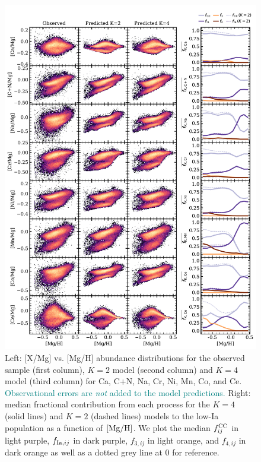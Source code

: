 \documentclass[modern]{aastex631}
\newcommand{\mgh}{[{\rm Mg}/{\rm H}]}
\newcommand{\fcc}{f_{ij}^{\rm CC}}
\newcommand{\add}[1]{\textcolor{teal}{#1}}
\begin{document}
\begin{figure}[htb!]
    \centering
    \includegraphics[width=\textwidth]{Paper/Figures/all_param_k4.pdf}
    \caption{Left: [X/Mg] vs. [Mg/H] abundance distributions for the observed sample (first column), $K=2$ model (second column) and $K=4$ model (third column) for Ca, C+N, Na, Cr, Ni, Mn, Co, and Ce. \add{Observational errors are \textit{not} added to the model predictions.} Right: median fractional contribution from each process for the $K=4$ (solid lines) and $K=2$ (dashed lines) models to the low-Ia population as a function of $\mgh$. We plot the median $\fcc$ in light purple, $f_{{\rm Ia}, ij}$ in dark purple, $f_{3, ij}$ in light orange, and $f_{4, ij}$ in dark orange as well as a dotted grey line at 0 for reference.} 
    \label{fig:all_paramK}
\end{figure}
\end{document}
